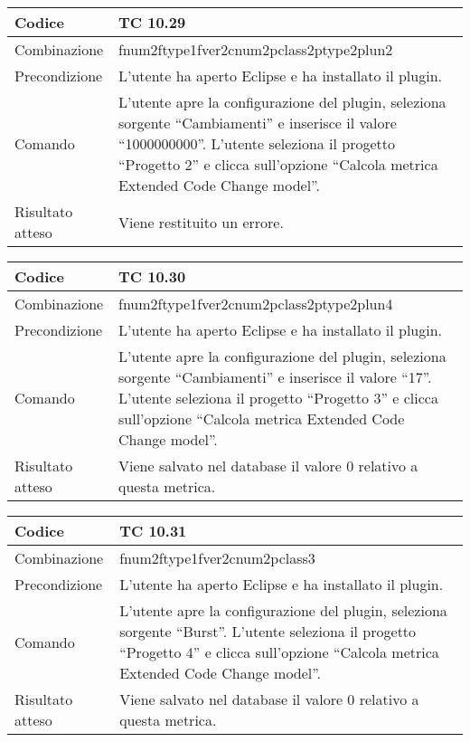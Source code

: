 \begin{table}[ht]
\begin{tabular}{|p{3cm}|p{9cm}|}
\hline
\cellcolor{lightgray}Codice				& TC 10.29								\\
\hline
\cellcolor{lightgray}Combinazione		& fnum2ftype1fver2cnum2pclass2ptype2plun2									\\
\hline
\cellcolor{lightgray}Precondizione		& L'utente ha aperto Eclipse e ha installato il plugin.		\\
\hline
\cellcolor{lightgray}Comando			& L'utente apre la configurazione del plugin, seleziona sorgente ``Cambiamenti'' e inserisce il valore ``1000000000''. L'utente seleziona il progetto ``Progetto 2''  e clicca sull'opzione ``Calcola metrica Extended Code Change model''.	\\
\hline
\cellcolor{lightgray}Risultato atteso	& Viene restituito un errore.\\
\hline
\end{tabular}
\end{table}

\begin{table}[ht]
\begin{tabular}{|p{3cm}|p{9cm}|}
\hline
\cellcolor{lightgray}Codice				& TC 10.30								\\
\hline
\cellcolor{lightgray}Combinazione		& fnum2ftype1fver2cnum2pclass2ptype2plun4									\\
\hline
\cellcolor{lightgray}Precondizione		& L'utente ha aperto Eclipse e ha installato il plugin.		\\
\hline
\cellcolor{lightgray}Comando			& L'utente apre la configurazione del plugin, seleziona sorgente ``Cambiamenti'' e inserisce il valore ``17''. L'utente seleziona il progetto ``Progetto 3''  e clicca sull'opzione ``Calcola metrica Extended Code Change model''.	\\
\hline
\cellcolor{lightgray}Risultato atteso	& Viene salvato nel database il valore 0 relativo a questa metrica.\\
\hline
\end{tabular}
\end{table}

\begin{table}[ht]
\begin{tabular}{|p{3cm}|p{9cm}|}
\hline
\cellcolor{lightgray}Codice				& TC 10.31								\\
\hline
\cellcolor{lightgray}Combinazione		& fnum2ftype1fver2cnum2pclass3									\\
\hline
\cellcolor{lightgray}Precondizione		& L'utente ha aperto Eclipse e ha installato il plugin.		\\
\hline
\cellcolor{lightgray}Comando			& L'utente apre la configurazione del plugin, seleziona sorgente ``Burst''. L'utente seleziona il progetto ``Progetto 4''  e clicca sull'opzione ``Calcola metrica Extended Code Change model''.	\\
\hline
\cellcolor{lightgray}Risultato atteso	& Viene salvato nel database il valore 0 relativo a questa metrica.\\
\hline
\end{tabular}
\end{table}

